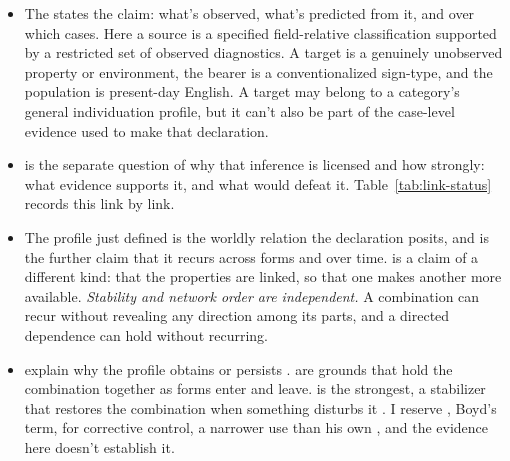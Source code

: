 \documentclass[12pt]{article}
\begin{document}
\begin{itemize}
\item The  states the claim: what's observed,
  what's predicted from it, and over which cases. Here a source is a specified
  field-relative classification supported by a restricted set of observed
  diagnostics. A target is a genuinely unobserved property or environment,
  the bearer is a conventionalized sign-type, and the population is
  present-day English. A target may belong to a category's general
  individuation profile, but it can't also be part of the case-level evidence
  used to make that declaration.
\item {} is the separate question of why that inference is
  licensed and how strongly: what evidence supports it, and what would defeat
  it. Table~\ref{tab:link-status} records this link by link.
\item The profile just defined is the worldly relation the declaration posits,
  and  is the further claim that it recurs across forms and
  over time.  is a claim of a different kind: that the
  properties are linked, so that one makes another more available.
  \emph{Stability and network order are independent.} A combination can
  recur without revealing any direction among its parts, and a directed
  dependence can hold without recurring.
\item {} explain why the profile obtains or
  persists \citep[12]{reynolds2026projectibilityHistory}.
   are grounds that hold the combination together as forms
  enter and leave.  is the strongest, a stabilizer
  that restores the combination when something disturbs
  it \citep[5]{reynolds2026notEveryStableCluster}. I reserve
  , Boyd's term, for corrective control, a narrower use
  than his own \citep[143]{boyd1999}, and the evidence here doesn't
  establish it.
\end{itemize}
\end{document}
